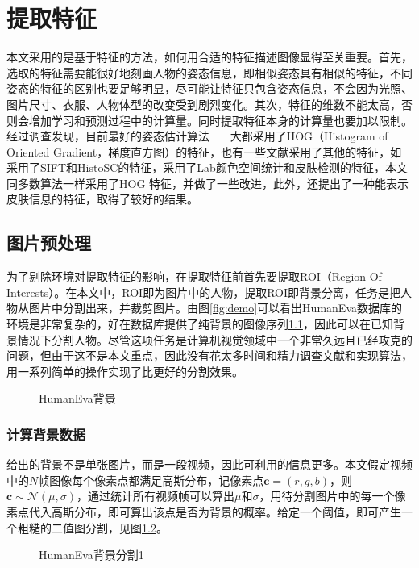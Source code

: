 

\chapter{提取特征}
\label{chap:feature}
本文采用的是基于特征的方法，如何用合适的特征描述图像显得至关重要。首先，选取的特征需要能很好地刻画人物的姿态信息，即相似姿态具有相似的特征，不同姿态的特征的区别也要足够明显，尽可能让特征只包含姿态信息，不会因为光照、图片尺寸、衣服、人物体型的改变受到剧烈变化。其次，特征的维数不能太高，否则会增加学习和预测过程中的计算量。同时提取特征本身的计算量也要加以限制。
经过调查发现，目前最好的姿态估计算法~\cite{ramanan2007learning}~\cite{yang2011articulated}~\cite{tian2012exploring} 大都采用了HOG（Histogram of Oriented Gradient，梯度直方图）的特征，也有一些文献采用了其他的特征，如\cite{bo2008fast}采用了SIFT和HistoSC的特征，\cite{eth_biwi_01027}采用了Lab颜色空间统计和皮肤检测的特征，本文同多数算法一样采用了HOG 特征，并做了一些改进，此外，还提出了一种能表示皮肤信息的特征，取得了较好的结果。
\section{图片预处理}
为了剔除环境对提取特征的影响，在提取特征前首先要提取ROI（Region Of Interests）。在本文中，ROI即为图片中的人物，提取ROI即背景分离，任务是把人物从图片中分割出来，并裁剪图片。由图\ref{fig:demo}可以看出HumanEva数据库的环境是非常复杂的，好在数据库提供了纯背景的图像序列\ref{fig:background}，因此可以在已知背景情况下分割人物。尽管这项任务是计算机视觉领域中一个非常久远且已经攻克的问题，但由于这不是本文重点，因此没有花太多时间和精力调查文献和实现算法，用一系列简单的操作实现了比\cite{Poppe2007}更好的分割效果。
\begin{figure}[htbp]
  \centering
  \caption{HumanEva背景}\label{fig:background}
\end{figure}
\subsection{计算背景数据}
给出的背景不是单张图片，而是一段视频，因此可利用的信息更多。本文假定视频中的$N$帧图像每个像素点都满足高斯分布，记像素点$\mathbf{c}=(r,g,b)$，则$\mathbf{c}\sim \mathcal{N}(\mu,\sigma)$，通过统计所有视频帧可以算出$\mu$和$\sigma$，用待分割图片中的每一个像素点代入高斯分布，即可算出该点是否为背景的概率。给定一个阈值，即可产生一个粗糙的二值图分割，见图\ref{fig:bk1}。
\begin{figure}[htbp]
  \centering
  \caption{HumanEva背景分割1}\label{fig:bk1}
\end{figure}

